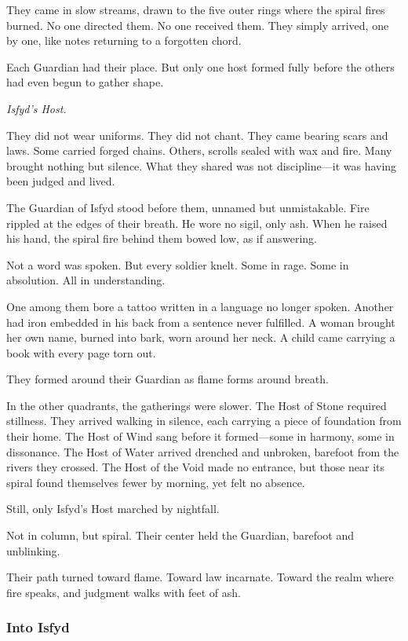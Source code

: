 \documentclass[12pt]{article}
\begin{document}
They came in slow streams, drawn to the five outer rings where the spiral fires burned. No one directed them. No one received them. They simply arrived, one by one, like notes returning to a forgotten chord.

Each Guardian had their place. But only one host formed fully before the others had even begun to gather shape.

\textit{Isfyd’s Host.}

They did not wear uniforms. They did not chant. They came bearing scars and laws. Some carried forged chains. Others, scrolls sealed with wax and fire. Many brought nothing but silence. What they shared was not discipline—it was having been judged and lived.

The Guardian of Isfyd stood before them, unnamed but unmistakable. Fire rippled at the edges of their breath. He wore no sigil, only ash. When he raised his hand, the spiral fire behind them bowed low, as if answering.

Not a word was spoken. But every soldier knelt. Some in rage. Some in absolution. All in understanding.

One among them bore a tattoo written in a language no longer spoken. Another had iron embedded in his back from a sentence never fulfilled. A woman brought her own name, burned into bark, worn around her neck. A child came carrying a book with every page torn out.

They formed around their Guardian as flame forms around breath.

In the other quadrants, the gatherings were slower. The Host of Stone required stillness. They arrived walking in silence, each carrying a piece of foundation from their home. The Host of Wind sang before it formed—some in harmony, some in dissonance. The Host of Water arrived drenched and unbroken, barefoot from the rivers they crossed. The Host of the Void made no entrance, but those near its spiral found themselves fewer by morning, yet felt no absence.

Still, only Isfyd’s Host marched by nightfall.

Not in column, but spiral. Their center held the Guardian, barefoot and unblinking.

Their path turned toward flame. Toward law incarnate. Toward the realm where fire speaks, and judgment walks with feet of ash.

\dotfill

\subsubsection*{Into Isfyd}
\end{document}
